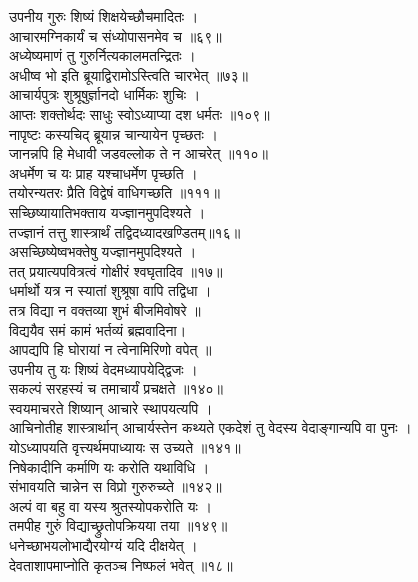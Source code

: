 उपनीय गुरुः शिष्यं शिक्षयेच्छौचमादितः ।\\[-2mm]
आचारमग्निकार्यं च संध्योपासनमेव च ॥६९॥\\
अध्येष्यमाणं तु गुरुर्नित्यकालमतन्द्रितः ।\\[-2mm]
अधीष्व भो इति ब्रूयाद्विरामोऽस्त्विति चारभेत् ॥७३॥\\
आचार्यपुत्रः शुश्रूषुर्ज्ञानदो धार्मिकः शुचिः ।\\[-2mm]
आप्तः शक्तोर्थदः साधुः स्वोऽध्याप्या दश धर्मतः ॥१०९॥\\
नापृष्टः कस्यचिद् ब्रूयान्न चान्यायेन पृच्छतः ।\\[-2mm]
जानन्नपि हि  मेधावी जडवल्लोक ते न आचरेत् ॥११०॥\\
अधर्मेण च यः प्राह यश्चाधर्मेण पृच्छति ।\\[-2mm]
तयोरन्यतरः प्रैति विद्वेषं वाधिगच्छति ॥१११॥\\
सच्छिष्यायातिभक्ताय यज्ज्ञानमुपदिश्यते ।\\[-2mm]
तज्ज्ञानं तत्तु शास्त्रार्थं तद्विदध्यादखण्डितम्॥१६॥\\
असच्छिष्येष्वभक्तेषु यज्ज्ञानमुपदिश्यते ।\\[-2mm]
तत् प्रयात्यपवित्रत्वं गोक्षीरं श्वघृतादिव ॥१७॥\\
धर्मार्थो यत्र न स्यातां शुश्रूषा वापि तद्विधा ।\\[-2mm]
तत्र विद्या न वक्तव्या शुभं बीजमिवोषरे ॥\\
विद्ययैव समं कामं भर्तव्यं ब्रह्मवादिना।\\[-2mm]
आपद्यपि हि घोरायां न त्वेनामिरिणो वपेत् ॥\\
उपनीय तु यः शिष्यं वेदमध्यापयेद्द्विजः ।\\[-2mm]
सकल्पं सरहस्यं च तमाचार्यं प्रचक्षते ॥१४०॥\\
स्वयमाचरते शिष्यान् आचारे स्थापयत्यपि ।\\[-2mm]
आचिनोतीह शास्त्रार्थान् आचार्यस्तेन कथ्यते
एकदेशं तु वेदस्य वेदाङ्गान्यपि वा पुनः ।\\[-2mm]
योऽध्यापयति वृत्त्यर्थमपाध्यायः स उच्यते ॥१४१॥\\
निषेकादीनि कर्माणि यः करोति यथाविधि ।\\[-2mm]
संभावयति चान्नेन स विप्रो गुरुरुच्य्ते ॥१४२॥\\
अल्पं वा बहु वा यस्य श्रुतस्योपकरोति यः ।\\[-2mm]
तमपीह गुरुं विद्याच्छ्रुतोपक्रियया तया ॥१४९॥\\
धनेच्छाभयलोभाद्यैरयोग्यं यदि दीक्षयेत् ।\\[-2mm]
देवताशापमाप्नोति कृतञ्च निष्फलं भवेत् ॥१८॥\\

